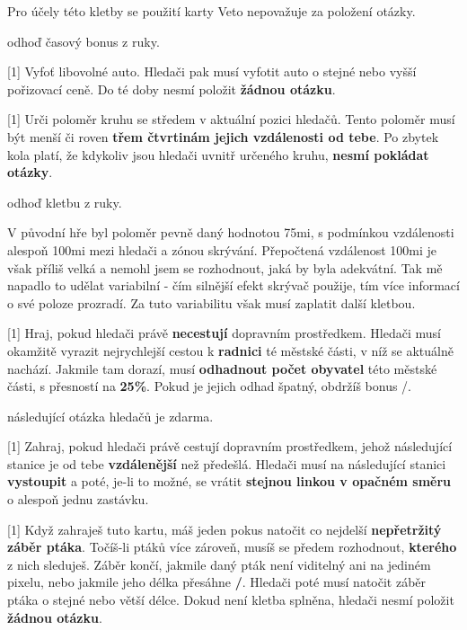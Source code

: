 \begin{cards}
	Pro účely této kletby se použití karty Veto nepovažuje za položení otázky.
	
	\cost odhoď časový bonus z ruky.
	
	 Vyfoť libovolné auto. Hledači pak musí vyfotit auto o stejné nebo vyšší pořizovací ceně. Do té doby nesmí položit \textbf{žádnou otázku}.
	
	 Urči poloměr kruhu se středem v aktuální pozici hledačů. Tento poloměr musí být menší či roven \textbf{třem čtvrtinám jejich vzdálenosti od tebe}. Po zbytek kola platí, že kdykoliv jsou hledači uvnitř určeného kruhu, \textbf{nesmí pokládat otázky}.
	
	\cost odhoď kletbu z ruky.
	
	\begin{reasoning}
		V původní hře byl poloměr pevně daný hodnotou 75mi, s podmínkou vzdálenosti alespoň 100mi mezi hledači a zónou skrývání. Přepočtená vzdálenost \dist100mi je však příliš velká a nemohl jsem se rozhodnout, jaká by byla adekvátní. Tak mě napadlo to udělat variabilní - čím silnější efekt skrývač použije, tím více informací o své poloze prozradí. Za tuto variabilitu však musí zaplatit další kletbou.
	\end{reasoning}
	
	 Hraj, pokud hledači právě \textbf{necestují} dopravním prostředkem. Hledači musí okamžitě vyrazit nejrychlejší cestou k \textbf{radnici} té městské části, v níž se aktuálně nachází. Jakmile tam dorazí, musí \textbf{odhadnout počet obyvatel} této městské části, s přesností na \textbf{25\%}. Pokud je jejich odhad špatný, obdržíš bonus \timecursecensustaker/.
	
	\cost následující otázka hledačů je zdarma.
	
	 Zahraj, pokud hledači právě cestují dopravním prostředkem, jehož následující stanice je od tebe \textbf{vzdálenější} než předešlá. Hledači musí na následující stanici \textbf{vystoupit} a poté, je-li to možné, se vrátit \textbf{stejnou linkou v opačném směru} o alespoň jednu zastávku.
	
	 Když zahraješ tuto kartu, máš jeden pokus natočit co nejdelší \textbf{nepřetržitý záběr ptáka}. Točíš-li ptáků více zároveň, musíš se předem rozhodnout, \textbf{kterého} z nich sleduješ. Záběr končí, jakmile daný pták není viditelný ani na jediném pixelu, nebo jakmile jeho délka přesáhne \textbf{\timecursebirdguide/}. Hledači poté musí natočit záběr ptáka o stejné nebo větší délce. Dokud není kletba splněna, hledači nesmí položit \textbf{žádnou otázku}.
	

\end{cards}
